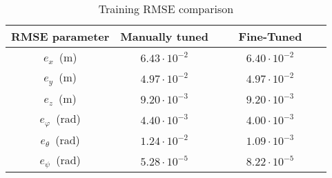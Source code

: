 \begin{table}[h!]
\centering
\caption{Training RMSE comparison}
\label{table:circular3_rmse}
\begin{tabular}{c|c|c}
\textbf{RMSE parameter} & \textbf{ Manually tuned} & \textbf{\ \ \ Fine-Tuned\ \ \ } \\
\hline
$e_{x}$\ (m) & $6.43\cdot 10^{-2}$ &  $6.40\cdot 10^{-2}$ \\
$e_{y}$\ (m) & $4.97\cdot 10^{-2}$ & $4.97\cdot 10^{-2}$ \\
$e_{z}$\ (m) & $9.20\cdot 10^{-3}$ &  $9.20\cdot 10^{-3}$ \\
$e_{\varphi}$\ (rad) & $4.40\cdot 10^{-3}$ & $4.00\cdot 10^{-3}$ \\
$e_{\theta}$\ (rad) & $1.24 \cdot 10^{-2}$ &  $1.09\cdot 10^{-3}$ \\
$e_{\psi}$\ (rad) & $5.28\cdot 10^{-5}$ & $8.22\cdot 10^{-5}$ \\
\end{tabular}
\end{table}